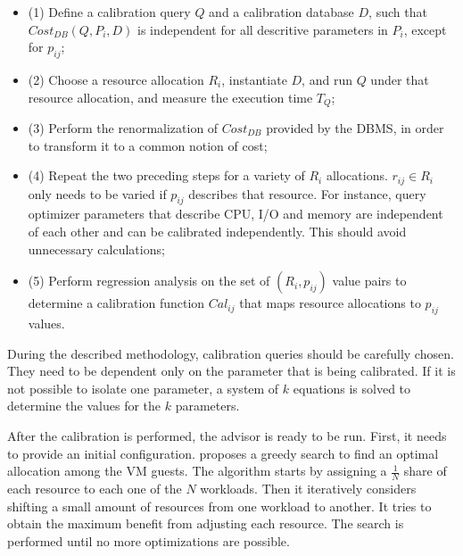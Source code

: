 \documentclass[jidm,a4paper]{jidm} %
\begin{document}
\begin{itemize}
 \item (1) Define a calibration query $Q$ and a calibration database $D$, such that $Cost_{DB}(Q,P_{i},D)$ is independent for all descritive parameters in $P_{i}$, except for $p_{ij}$; \\
  \item (2) Choose a resource allocation $R_{i}$, instantiate $D$, and run $Q$ under that resource allocation, and measure the execution time $T_{Q}$; \\
  \item (3) Perform the renormalization of $Cost_{DB}$ provided by the DBMS, in order to transform it to a common notion of cost; \\
  \item (4) Repeat the two preceding steps for a variety of $R_{i}$ allocations. $r_{ij} \in R_{i}$ only needs to be varied if $p_{ij}$ describes that resource. For instance, query optimizer parameters that describe CPU, I/O and memory are independent of each other and can be calibrated independently. This should avoid unnecessary calculations; \\
  \item (5) Perform regression analysis on the set of $(R_{i},p_{ij})$ value pairs to determine a calibration function $Cal_{ij}$ that maps resource allocations to $p_{ij}$ values. \\
\end{itemize}

During the described methodology, calibration queries should be carefully chosen. They need to be dependent only on the parameter that is being calibrated. If it is not possible to isolate one parameter, a system of $k$ equations is solved to determine the values for the $k$ parameters.

After the calibration is performed, the advisor is ready to be run. First, it needs to provide an initial configuration.  \cite{Soror:2008:AVM:1376616.1376711} proposes a greedy search to find an optimal allocation among the VM guests. The algorithm starts by assigning a $\frac{1}{N}$ share of each resource to each one of the $N$ workloads. Then it iteratively considers shifting a small amount of resources from one workload to another. It tries to obtain the maximum benefit from adjusting each resource. The search is performed until no more optimizations are possible.
\end{document}
